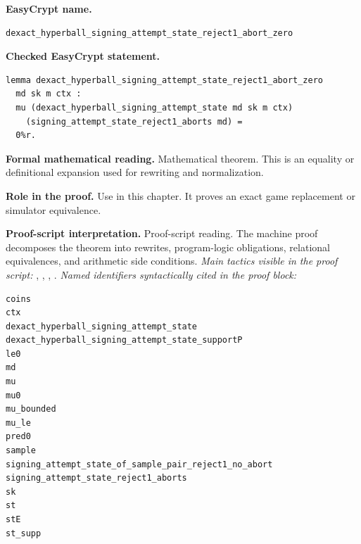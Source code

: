 \begin{formaltheorem}
\noindent\textbf{EasyCrypt name.}
\begin{lstlisting}[language=EasyCrypt,basicstyle=\ttfamily\scriptsize]
dexact_hyperball_signing_attempt_state_reject1_abort_zero
\end{lstlisting}
\noindent\textbf{Checked EasyCrypt statement.}
\begin{lstlisting}[language=EasyCrypt,basicstyle=\ttfamily\scriptsize]
lemma dexact_hyperball_signing_attempt_state_reject1_abort_zero
  md sk m ctx :
  mu (dexact_hyperball_signing_attempt_state md sk m ctx)
    (signing_attempt_state_reject1_aborts md) =
  0%r.
\end{lstlisting}
\noindent\textbf{Formal mathematical reading.}
Mathematical theorem. This is an equality or definitional expansion used for rewriting and normalization.

\noindent\textbf{Role in the proof.}
Use in this chapter. It proves an exact game replacement or simulator equivalence.

\noindent\textbf{Proof-script interpretation.}
Proof-script reading. The machine proof decomposes the theorem into rewrites, program-logic obligations, relational equivalences, and arithmetic side conditions.
\emph{Main tactics visible in the proof script:} , , , .
\emph{Named identifiers syntactically cited in the proof block:}
\begin{lstlisting}[language=EasyCrypt,basicstyle=\ttfamily\scriptsize]
coins
ctx
dexact_hyperball_signing_attempt_state
dexact_hyperball_signing_attempt_state_supportP
le0
md
mu
mu0
mu_bounded
mu_le
pred0
sample
signing_attempt_state_of_sample_pair_reject1_no_abort
signing_attempt_state_reject1_aborts
sk
st
stE
st_supp
\end{lstlisting}

\end{formaltheorem}

